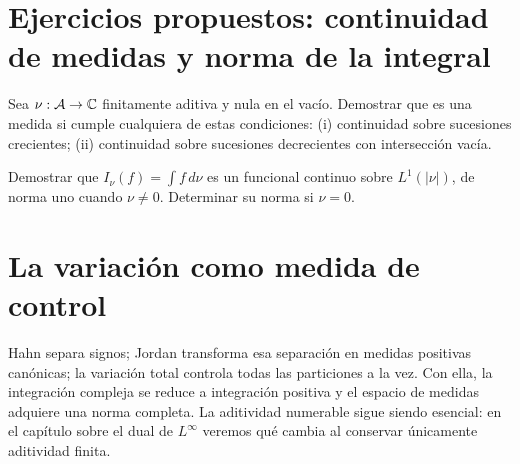 \section{Ejercicios propuestos: continuidad de medidas y norma de la integral}
\begin{ejercicio}\label{ej:v2-l26-1}
Sea $\nu:\mathcal A\to\mathbb C$ finitamente aditiva y nula en el vacío. Demostrar que es una medida si cumple cualquiera de estas condiciones: (i) continuidad sobre sucesiones crecientes; (ii) continuidad sobre sucesiones decrecientes con intersección vacía.
\end{ejercicio}

\begin{ejercicio}\label{ej:v2-l26-2}
Demostrar que $I_\nu(f)=\int f\,d\nu$ es un funcional continuo sobre $L^1(|\nu|)$, de norma uno cuando $\nu\ne0$. Determinar su norma si $\nu=0$.
\end{ejercicio}

\section{La variación como medida de control}
Hahn separa signos; Jordan transforma esa separación en medidas positivas canónicas; la variación total controla todas las particiones a la vez. Con ella, la integración compleja se reduce a integración positiva y el espacio de medidas adquiere una norma completa. La aditividad numerable sigue siendo esencial: en el capítulo sobre el dual de $L^\infty$ veremos qué cambia al conservar únicamente aditividad finita.
